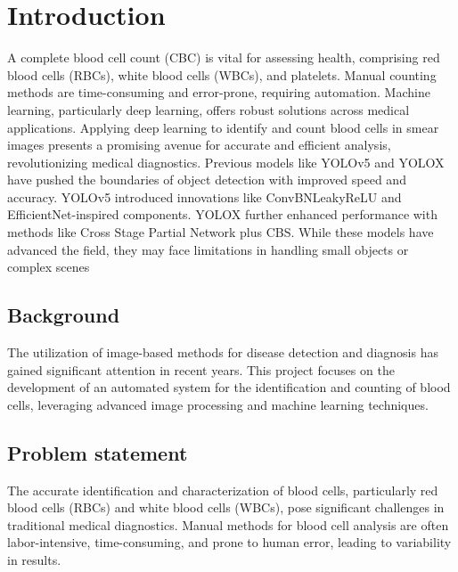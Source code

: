 \chapter{Introduction}
\label{ch:into} %



A complete blood cell count (CBC) is vital for assessing health, comprising red blood cells (RBCs), white blood cells (WBCs), and platelets. Manual counting methods are time-consuming and error-prone, requiring automation. Machine learning, particularly deep learning, offers robust solutions across medical applications. Applying deep learning to identify and count blood cells in smear images presents a promising avenue for accurate and efficient analysis, revolutionizing medical diagnostics. Previous models like YOLOv5 and YOLOX have pushed the boundaries of object detection with improved speed and accuracy. YOLOv5 introduced innovations like ConvBNLeakyReLU and EfficientNet-inspired components. YOLOX further enhanced performance with methods like Cross Stage Partial Network plus CBS. While these models have advanced the field, they may face limitations in handling small objects or complex scenes
       

\section{Background}
\label{sec:into_back}
The utilization of image-based methods for disease detection and diagnosis has gained significant attention in recent years. This project focuses on the development of an automated system for the identification and counting of blood cells, leveraging advanced image processing and machine learning techniques.

\section{Problem statement}
\label{sec:intro_prob_art}
The accurate identification and characterization of blood cells, particularly red blood cells (RBCs) and white blood cells (WBCs), pose significant challenges in traditional medical diagnostics. Manual methods for blood cell analysis are often labor-intensive, time-consuming, and prone to human error, leading to variability in results.
